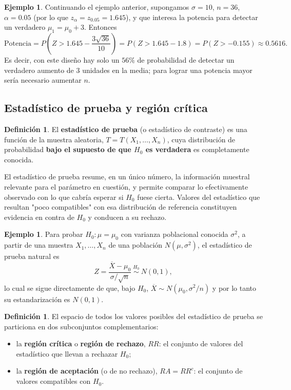 \documentclass[11pt,a4paper]{article}
\theoremstyle{plain}
\theoremstyle{definition}
\newtheorem{definicion}[teorema]{Definición}
\newtheorem{ejemplo}[teorema]{Ejemplo}
\theoremstyle{remark}
\begin{document}
\begin{ejemplo}
Continuando el ejemplo anterior, supongamos $\sigma=10$, $n=36$, $\alpha=0.05$ (por lo que $z_\alpha=z_{0.05}=1.645$), y que interesa la potencia para detectar un verdadero $\mu_1=\mu_0+3$. Entonces
\[
\text{Potencia}= P\!\left(Z> 1.645 - \frac{3\sqrt{36}}{10}\right) = P(Z>1.645-1.8)=P(Z>-0.155)\approx 0.5616.
\]
Es decir, con este diseño hay solo un $56\%$ de probabilidad de detectar un verdadero aumento de $3$ unidades en la media; para lograr una potencia mayor sería necesario aumentar $n$.
\end{ejemplo}

\subsection{Estadístico de prueba y región crítica}

\begin{definicion}
El \textbf{estadístico de prueba} (o estadístico de contraste) es una función de la muestra aleatoria, $T=T(X_1,\dots,X_n)$, cuya distribución de probabilidad \textbf{bajo el supuesto de que $H_0$ es verdadera} es completamente conocida.
\end{definicion}

El estadístico de prueba resume, en un único número, la información muestral relevante para el parámetro en cuestión, y permite comparar lo efectivamente observado con lo que cabría esperar si $H_0$ fuese cierta. Valores del estadístico que resultan "poco compatibles" con esa distribución de referencia constituyen evidencia en contra de $H_0$ y conducen a su rechazo.

\begin{ejemplo}
Para probar $H_0:\mu=\mu_0$ con varianza poblacional conocida $\sigma^2$, a partir de una muestra $X_1,\dots,X_n$ de una población $N(\mu,\sigma^2)$, el estadístico de prueba natural es
\[
Z=\frac{\overline X-\mu_0}{\sigma/\sqrt n}\ \overset{H_0}{\sim}\ N(0,1),
\]
lo cual se sigue directamente de que, bajo $H_0$, $\overline X\sim N(\mu_0,\sigma^2/n)$ y por lo tanto su estandarización es $N(0,1)$.
\end{ejemplo}

\begin{definicion}
El espacio de todos los valores posibles del estadístico de prueba se particiona en dos subconjuntos complementarios:
\begin{itemize}[nosep]
\item la \textbf{región crítica} o \textbf{región de rechazo}, $RR$: el conjunto de valores del estadístico que llevan a rechazar $H_0$;
\item la \textbf{región de aceptación} (o de no rechazo), $RA=RR^c$: el conjunto de valores compatibles con $H_0$.
\end{itemize}
\end{definicion}
\end{document}
